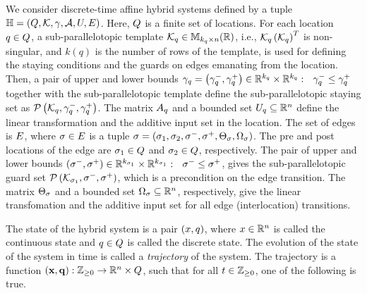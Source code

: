 

We consider discrete-time affine hybrid systems defined by a tuple $\mathbb{H} =
\left(Q,\mathcal{K},\gamma,\mathcal{A},U,E\right)$. Here, $Q$ is a finite set of locations.  For each location
$q\in Q$, a sub-parallelotopic template
$\mathcal{K}_q\in\mathbb{M}_{k_q\times n}(\mathbb{\mathbb{R}})$, i.e.,
$\mathcal{K}_q\left(\mathcal{K}_q\right)^T$ is non-singular, and $k(q)$
is the number of rows of the template, is used for defining the
staying conditions and the guards on edges emanating from the
location.  Then, a pair of upper and lower bounds
$\gamma_q=\left(\gamma^-_q,\gamma^+_q\right)\in\mathbb{R}^{k_q}\times\mathbb{R}^{k_q}:
~~\gamma^-_q\leq\gamma^+_q$ together with the sub-parallelotopic
template define the sub-parallelotopic staying set as
$\mathcal{P}\left(\mathcal{K}_q,\gamma^-_q,\gamma^+_q\right)$.  The matrix
$A_q$ and a bounded set $U_q\subseteq\mathbb{R}^n$ define the
linear transformation and the additive input set in the location.  The
set of edges is $E$, where $\sigma\in E$ is a tuple $\sigma
= \left(\sigma_{1},\sigma_{2},\sigma^-,\sigma^+,\Theta_\sigma,\Omega_\sigma\right)$.
The pre and post locations of the edge are
$\sigma_{1}\in Q$ and $\sigma_{2}\in Q$,
respectively.  The pair of upper and lower bounds
$\left(\sigma^-,\sigma^+\right)\in\mathbb{R}^{k_{\sigma_{1}}}\times\mathbb{R}^{k_{\sigma_{1}}}:~~\sigma^-\leq\sigma^+$,
gives the sub-parallelotopic guard set
$\mathcal{P}\left(\mathcal{K}_{\sigma_{1}},\sigma^-,\sigma^+\right)$, which
is a precondition on the edge transition.  The matrix $\Theta_\sigma$
and a bounded set $\Omega_\sigma\subseteq\mathbb{R}^n$, respectively,
give the linear transfomation and the additive input set for all edge
(interlocation) transitions.

The state of the hybrid system is a pair $(x,q)$, where
$x\in\mathbb{R}^n$ is called the continuous state and
$q\in Q$ is called the discrete state.  The
evolution of the state of the system in time is called a
\emph{trajectory} of the system.  The trajectory is a function
$\left({\bf x},{\bf q}\right):\mathbb{Z}_{\geq 0}\rightarrow\mathbb{R}^n\times Q$, such
that for all $t\in\mathbb{Z}_{\geq 0}$, one of the following is true.

